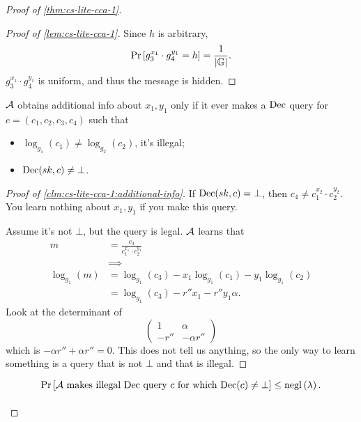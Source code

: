 \begin{proof}[Proof of \cref{thm:cs-lite-cca-1}]
\begin{proof}[Proof of \cref{lem:cs-lite-cca-1}]
		Since $h$ is arbitrary,
		\begin{equation*}
			\mathop{\mathrm{Pr}}\limits_{} \left[ {
				g_3^{x_1} \cdot g_4^{y_1} = h
			} \right] = \frac{1}{\left|{\mathbb{G}}\right|}.
		\end{equation*}
		$g_3^{x_1} \cdot g_4^{y_1}$ is uniform, and thus the message is hidden.
	\end{proof}

	\begin{claim} \label{clm:cs-lite-cca-1:additional-info}
		$\mathcal{A}$ obtains additional info about $x_1, y_1$ only if it ever makes a $\mathrm{Dec}$ query for $c = (c_1, c_2, c_3, c_4)$ such that
		\begin{itemize}
			\item $\log_{g_1}(c_1) \neq \log_{g_2}(c_2)$, \ie it's illegal;
			\item $\mathrm{Dec}(sk, c) \neq \bot$. \qedhere
		\end{itemize}
	\end{claim}

	\begin{proof}[Proof of \cref{clm:cs-lite-cca-1:additional-info}]
		If $\mathrm{Dec}(sk, c) = \bot$, then $c_4 \neq c_1^{x_2} \cdot c_2^{y_2}$.
		You learn nothing about $x_1, y_1$ if you make this query.

		Assume it's not $\bot$, but the query is legal.
		$\mathcal{A}$ learns that
		\begin{align*}
			m & = \frac{c_3}{c_1^{x_1} \cdot c_2^{y_1}} \\
			& \implies \\
			\log_{g_1}(m)
			& =
			\log_{g_1}(c_3) - x_1 \log_{g_1} (c_1) - y_1 \log_{g_1} (c_2) \\
			& =
			\log_{g_1}(c_3) - r'' x_1 - r'' y_1 \alpha.
		\end{align*}
		Look at the determinant of
		\begin{equation*}
			\begin{pmatrix}
				1 & \alpha \\
				-r'' & -\alpha r''
			\end{pmatrix}
		\end{equation*}
		which is $- \alpha r'' + \alpha r'' = 0$.
		This does not tell us anything, so the only way to learn something is a query that is not $\bot$ and that is illegal.
	\end{proof}

	\begin{claim} \label{clm:cs-lite-cca-1:illegal-query}
		\begin{equation*}
			\mathop{\mathrm{Pr}}\limits_{} \left[ {
				\mathcal{A} \text{ makes illegal $\mathrm{Dec}$ query $c$ for which $\mathrm{Dec}(c) \neq \bot$}
			} \right] \le \mathrm{negl}\left({\lambda}\right).
		\end{equation*}
	\end{claim}


\end{proof}
